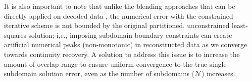 


It is also important to note that unlike the blending approaches that can be directly applied on decoded data \cite{grindeanu-blending}, the numerical error with the constrained iterative scheme is not bounded by the original partitioned, unconstrained least-squares solution; i,e., imposing subdomain boundary constraints can create artificial numerical peaks (non-monotonic) in reconstructed data as we converge towards continuity recovery. A solution to address this issue is to increase the amount of overlap range to ensure uniform convergence to the true single-subdomain solution error, even as the number of subdomains ($\mathcal{N}$) increases.


